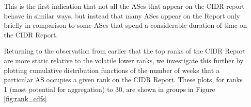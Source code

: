 %

This is the first indication that not all the ASes that appear on the CIDR
report behave in similar ways, but instead that many ASes appear on the Report
only briefly in comparison to some ASes that spend a considerable duration of
time on the CIDR Report.


Returning to the observation from earlier that the top ranks of the CIDR Report
are more static relative to the volatile lower ranks, we investigate this
further by plotting cumulative distribution functions of the number of weeks
that a particular AS occupies a given rank on the CIDR Report. These plots, for
ranks 1 (most potential for aggregation) to 30, are shown in groups in Figure
\ref{fig:rank_cdfs}

